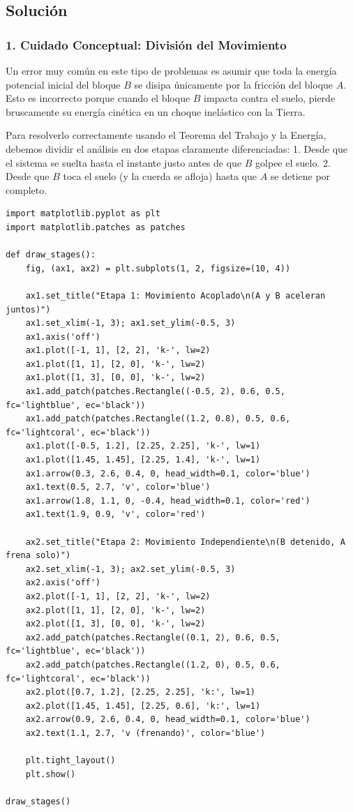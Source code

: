 \documentclass[12pt, a4paper]{article}
\begin{document}
\subsection*{Solución}

\subsubsection*{1. Cuidado Conceptual: División del Movimiento}
Un error muy común en este tipo de problemas es asumir que toda la energía potencial inicial del bloque $B$ se disipa únicamente por la fricción del bloque $A$. Esto es incorrecto porque cuando el bloque $B$ impacta contra el suelo, pierde bruscamente su energía cinética en un choque inelástico con la Tierra. 

Para resolverlo correctamente usando el Teorema del Trabajo y la Energía, debemos dividir el análisis en dos etapas claramente diferenciadas:
1. Desde que el sistema se suelta hasta el instante justo antes de que $B$ golpee el suelo.
2. Desde que $B$ toca el suelo (y la cuerda se afloja) hasta que $A$ se detiene por completo.

\begin{lstlisting}
import matplotlib.pyplot as plt
import matplotlib.patches as patches

def draw_stages():
    fig, (ax1, ax2) = plt.subplots(1, 2, figsize=(10, 4))
    
    ax1.set_title("Etapa 1: Movimiento Acoplado\n(A y B aceleran juntos)")
    ax1.set_xlim(-1, 3); ax1.set_ylim(-0.5, 3)
    ax1.axis('off')
    ax1.plot([-1, 1], [2, 2], 'k-', lw=2)
    ax1.plot([1, 1], [2, 0], 'k-', lw=2)
    ax1.plot([1, 3], [0, 0], 'k-', lw=2)
    ax1.add_patch(patches.Rectangle((-0.5, 2), 0.6, 0.5, fc='lightblue', ec='black'))
    ax1.add_patch(patches.Rectangle((1.2, 0.8), 0.5, 0.6, fc='lightcoral', ec='black'))
    ax1.plot([-0.5, 1.2], [2.25, 2.25], 'k-', lw=1)
    ax1.plot([1.45, 1.45], [2.25, 1.4], 'k-', lw=1)
    ax1.arrow(0.3, 2.6, 0.4, 0, head_width=0.1, color='blue')
    ax1.text(0.5, 2.7, 'v', color='blue')
    ax1.arrow(1.8, 1.1, 0, -0.4, head_width=0.1, color='red')
    ax1.text(1.9, 0.9, 'v', color='red')
    
    ax2.set_title("Etapa 2: Movimiento Independiente\n(B detenido, A frena solo)")
    ax2.set_xlim(-1, 3); ax2.set_ylim(-0.5, 3)
    ax2.axis('off')
    ax2.plot([-1, 1], [2, 2], 'k-', lw=2)
    ax2.plot([1, 1], [2, 0], 'k-', lw=2)
    ax2.plot([1, 3], [0, 0], 'k-', lw=2)
    ax2.add_patch(patches.Rectangle((0.1, 2), 0.6, 0.5, fc='lightblue', ec='black'))
    ax2.add_patch(patches.Rectangle((1.2, 0), 0.5, 0.6, fc='lightcoral', ec='black'))
    ax2.plot([0.7, 1.2], [2.25, 2.25], 'k:', lw=1)
    ax2.plot([1.45, 1.45], [2.25, 0.6], 'k:', lw=1)
    ax2.arrow(0.9, 2.6, 0.4, 0, head_width=0.1, color='blue')
    ax2.text(1.1, 2.7, 'v (frenando)', color='blue')

    plt.tight_layout()
    plt.show()

draw_stages()
\end{lstlisting}
\end{document}
